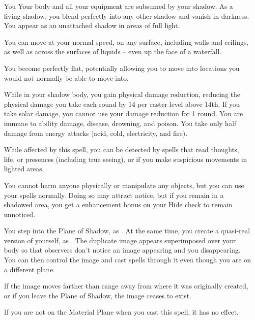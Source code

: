 \begin{spellheader}
    \spelldur{\durmed \dismissable}
\end{spellheader}
\begin{spelleffects}
    \begin{spelltarget}{You}
        \spelleffect Your body and all your equipment are subsumed by your shadow. As a living shadow, you blend perfectly into any other shadow and vanish in darkness. You appear as an unattached shadow in areas of full light.
        \par You can move at your normal speed, on any surface, including walls and ceilings, as well as across the surfaces of liquids -- even up the face of a waterfall.
        \par You become perfectly flat, potentially allowing you to move into locations you would not normally be able to move into.
        \par While in your shadow body, you gain physical damage reduction, reducing the physical damage you take each round by 14  per caster level above 14th. If you take solar damage, you cannot use your damage reduction for 1 round. You are immune to ability damage, disease, drowning, and poison. You take only half damage from energy attacks (acid, cold, electricity, and fire).
        \par While affected by this spell, you can be detected by spells that read thoughts, life, or presences (including true seeing), or if you make suspicious movements in lighted areas.
        \par You cannot harm anyone physically or manipulate any objects, but you can use your spells normally. Doing so may attract notice, but if you remain in a shadowed area, you get a  enhancement bonus on your Hide check to remain unnoticed.
    \end{spelltarget}
\end{spelleffects}

\begin{spellheader}
    \spelldur{\durmed}
\end{spellheader}
\begin{spelleffects}
    \spelleffect You step into the Plane of Shadow, as . At the same time, you create a quasi-real version of yourself, as . The duplicate image appears superimposed over your body so that observers don't notice an image appearing and you disappearing. You can then control the image and cast spells through it even though you are on a different plane.
\end{spelleffects}
\begin{spellfooter}
    \spellnotes If the image moves farther than \rnglong range away from where it was originally created, or if you leave the Plane of Shadow, the image ceases to exist.

    If you are not on the Material Plane when you cast this spell, it has no effect.
\end{spellfooter}

